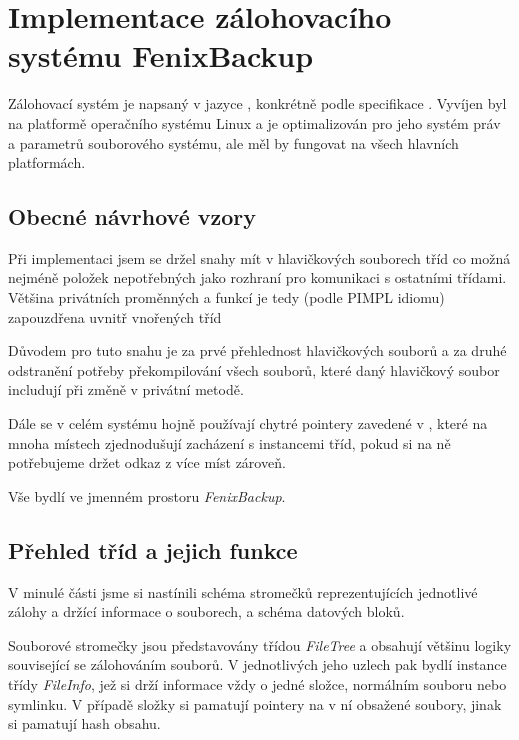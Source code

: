 \chapter{Implementace zálohovacího systému FenixBackup}

Zálohovací systém je napsaný v jazyce \Cpp, konkrétně podle specifikace
. Vyvíjen byl na platformě operačního systému Linux a je optimalizován
pro jeho systém práv a parametrů souborového systému, ale měl by fungovat na
všech hlavních platformách.

\section{Obecné návrhové vzory}


Při implementaci jsem se držel snahy mít v hlavičkových souborech tříd co možná
nejméně položek nepotřebných jako rozhraní pro komunikaci s ostatními třídami.
Většina privátních proměnných a funkcí je tedy (podle \gls{PIMPL} idiomu)
zapouzdřena uvnitř vnořených tříd

Důvodem pro tuto snahu je za prvé přehlednost hlavičkových souborů a za druhé
odstranění potřeby překompilování všech souborů, které daný hlavičkový soubor
includují při změně v privátní metodě.

Dále se v celém systému hojně používají chytré pointery zavedené v ,
které na mnoha místech zjednodušují zacházení s instancemi tříd, pokud si na ně
potřebujeme držet odkaz z více míst zároveň.

Vše bydlí ve jmenném prostoru {\it FenixBackup}.

\section{Přehled tříd a jejich funkce}

V minulé části jsme si nastínili schéma stromečků reprezentujících jednotlivé
zálohy a držící informace o souborech, a schéma datových bloků.

Souborové stromečky jsou představovány třídou {\it FileTree} a obsahují většinu
logiky související se zálohováním souborů. V jednotlivých jeho uzlech pak bydlí
instance třídy {\it FileInfo}, jež si drží informace vždy o jedné složce,
normálním souboru nebo symlinku. V případě složky si pamatují pointery na v ní
obsažené soubory, jinak si pamatují hash obsahu.

